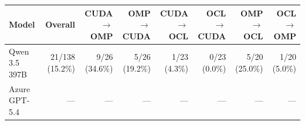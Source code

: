 \begin{tabular}{lrrrrrrr}
\toprule
Model & Overall & CUDA$\to$OMP & OMP$\to$CUDA & CUDA$\to$OCL & OCL$\to$CUDA & OMP$\to$OCL & OCL$\to$OMP \\
\midrule
Qwen 3.5 397B & 21/138 (15.2\%) & 9/26 (34.6\%) & 5/26 (19.2\%) & 1/23 (4.3\%) & 0/23 (0.0\%) & 5/20 (25.0\%) & 1/20 (5.0\%) \\
Azure GPT-5.4 & --- & --- & --- & --- & --- & --- & --- \\  %
\bottomrule
\end{tabular}
